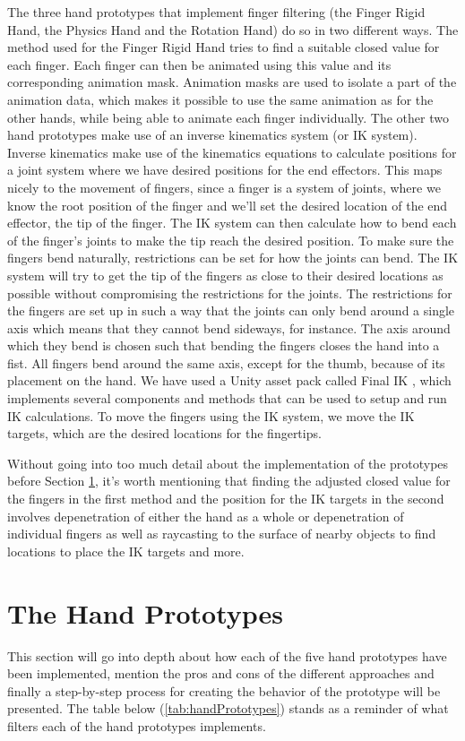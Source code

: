 The three hand prototypes that implement finger filtering (the Finger Rigid Hand, the Physics Hand and the Rotation Hand) do so in two different ways. The method used for the Finger Rigid Hand tries to find a suitable closed value for each finger. Each finger can then be animated using this value and its corresponding animation mask. Animation masks are used to isolate a part of the animation data, which makes it possible to use the same animation as for the other hands, while being able to animate each finger individually. The other two hand prototypes make use of an inverse kinematics system (or IK system). Inverse kinematics make use of the kinematics equations to calculate positions for a joint system where we have desired positions for the end effectors. This maps nicely to the movement of fingers, since a finger is a system of joints, where we know the root position of the finger and we'll set the desired location of the end effector, the tip of the finger. The IK system can then calculate how to bend each of the finger's joints to make the tip reach the desired position. To make sure the fingers bend naturally, restrictions can be set for how the joints can bend. The IK system will try to get the tip of the fingers as close to their desired locations as possible without compromising the restrictions for the joints. The restrictions for the fingers are set up in such a way that the joints can only bend around a single axis which means that they cannot bend sideways, for instance. The axis around which they bend is chosen such that bending the fingers closes the hand into a fist. All fingers bend around the same axis, except for the thumb, because of its placement on the hand. We have used a Unity asset pack called Final IK \parencite{RootMotion2017}, which implements several components and methods that can be used to setup and run IK calculations. To move the fingers using the IK system, we move the IK targets, which are the desired locations for the fingertips.

Without going into too much detail about the implementation of the prototypes before Section \ref{sec:handPrototypes}, it's worth mentioning that finding the adjusted closed value for the fingers in the first method and the position for the IK targets in the second involves depenetration of either the hand as a whole or depenetration of individual fingers as well as raycasting to the surface of nearby objects to find locations to place the IK targets and more.

\section{The Hand Prototypes}
\label{sec:handPrototypes}
This section will go into depth about how each of the five hand prototypes have been implemented, mention the pros and cons of the different approaches and finally a step-by-step process for creating the behavior of the prototype will be presented. The table below (\ref{tab:handPrototypes}) stands as a reminder of what filters each of the hand prototypes implements.

